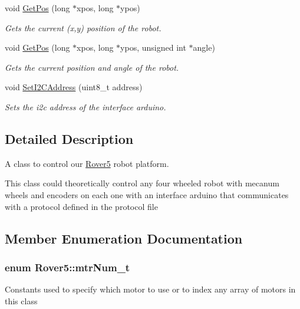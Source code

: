 \begin{DoxyCompactItemize}
void \hyperlink{classRover5_a0b5119724453ab464c539402b6828d1e}{Get\-Pos} (long $\ast$xpos, long $\ast$ypos)
\begin{DoxyCompactList}\small\item\em Gets the current (x,y) position of the robot. \end{DoxyCompactList}\item 
void \hyperlink{classRover5_a9f70c19d5b644c29da9abb04cc2ccfea}{Get\-Pos} (long $\ast$xpos, long $\ast$ypos, unsigned int $\ast$angle)
\begin{DoxyCompactList}\small\item\em Gets the current position and angle of the robot. \end{DoxyCompactList}\item 
\hypertarget{classRover5_aeb11dcea3c16c74c96f447f8c1a0fb82}{void \hyperlink{classRover5_aeb11dcea3c16c74c96f447f8c1a0fb82}{Set\-I2\-C\-Address} (uint8\-\_\-t address)}\label{classRover5_aeb11dcea3c16c74c96f447f8c1a0fb82}

\begin{DoxyCompactList}\small\item\em Sets the i2c address of the interface arduino. \end{DoxyCompactList}\end{DoxyCompactItemize}


\subsection{Detailed Description}
A class to control our \hyperlink{classRover5}{Rover5} robot platform. 

This class could theoretically control any four wheeled robot with mecanum wheels and encoders on each one with an interface arduino that communicates with a protocol defined in the protocol file 

\subsection{Member Enumeration Documentation}
\hypertarget{classRover5_a7ab37bde98ed7f9626e8489e754b0afe}{
\subsubsection[{mtr\-Num\-\_\-t}]{\setlength{\rightskip}{0pt plus 5cm}enum {\bf Rover5\-::mtr\-Num\-\_\-t}}}\label{classRover5_a7ab37bde98ed7f9626e8489e754b0afe}
Constants used to specify which motor to use or to index any array of motors in this class 


